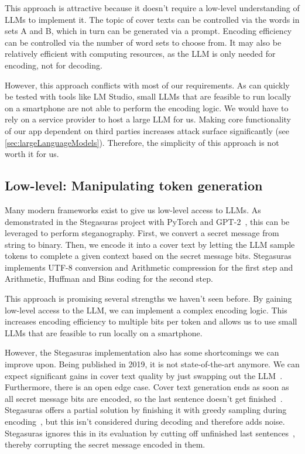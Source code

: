 This approach is attractive because it doesn't require a low-level understanding of \glspl{LLM} to implement it. The topic of cover texts can be controlled via the words in sets A and B, which in turn can be generated via a prompt. Encoding efficiency can be controlled via the number of word sets to choose from. It may also be relatively efficient with computing resources, as the \gls{LLM} is only needed for encoding, not for decoding.

However, this approach conflicts with most of our requirements. As can quickly be tested with tools like LM Studio, small \glspl{LLM} that are feasible to run locally on a smartphone are not able to perform the encoding logic. We would have to rely on a service provider to host a large \gls{LLM} for us. Making core functionality of our app dependent on third parties increases attack surface significantly (see \cref{sec:largeLanguageModels}). Therefore, the simplicity of this approach is not worth it for us.

\subsection{Low-level: Manipulating token generation}
\label{sec:lowLevelManipulatingTokenGeneration}
Many modern frameworks exist to give us low-level access to \glspl{LLM}. As demonstrated in the Stegasuras project with PyTorch and GPT-2~\cite{zieglerNeuralLinguisticSteganography2019,zieglerHarvardnlpNeuralSteganography2025,zieglerStegasuras2025}, this can be leveraged to perform steganography. First, we convert a secret message from string to binary. Then, we encode it into a cover text by letting the \gls{LLM} sample tokens to complete a given context based on the secret message bits. Stegasuras implements UTF-8 conversion and Arithmetic compression for the first step and Arithmetic, Huffman and Bins coding for the second step.

This approach is promising several strengths we haven't seen before. By gaining low-level access to the \gls{LLM}, we can implement a complex encoding logic. This increases encoding efficiency to multiple bits per token and allows us to use small \glspl{LLM} that are feasible to run locally on a smartphone.

However, the Stegasuras implementation also has some shortcomings we can improve upon. Being published in 2019, it is not state-of-the-art anymore. We can expect significant gains in cover text quality by just swapping out the \gls{LLM}~\cite{wuGenerativeTextSteganography2024}. Furthermore, there is an open edge case. Cover text generation ends as soon as all secret message bits are encoded, so the last sentence doesn't get finished~\cite{zieglerStegasuras2025}. Stegasuras offers a partial solution by finishing it with greedy sampling during encoding~\cite{zieglerHarvardnlpNeuralSteganography2025}, but this isn't considered during decoding and therefore adds noise. Stegasuras ignores this in its evaluation by cutting off unfinished last sentences~\cite{zieglerNeuralLinguisticSteganography2019}, thereby corrupting the secret message encoded in them.

